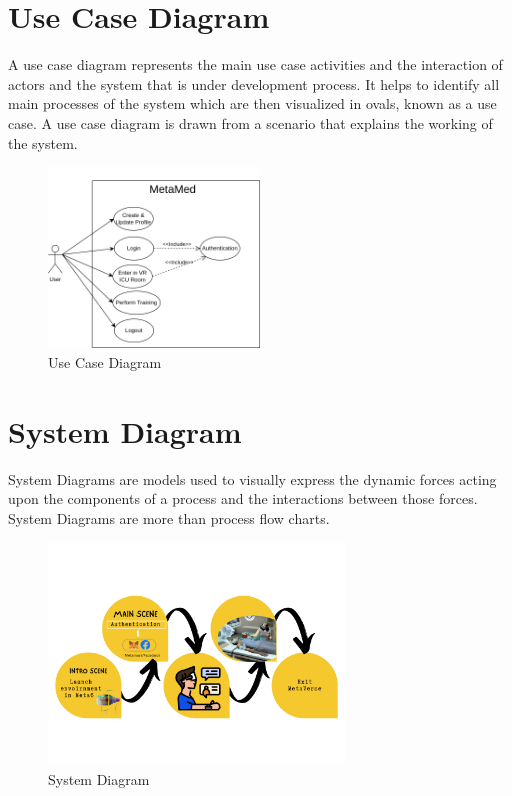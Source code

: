 \section{Use Case Diagram}
A use case diagram represents the main use case activities and the interaction of actors and the system that is under development process. It helps to identify all main processes of the system which are then visualized in ovals, known as a use case. A use case diagram is drawn from a scenario that explains the working of the system.
\begin{figure}[h]
    \centering
    \includegraphics[width=0.5\textwidth, height=0.3\textheight]{Images/Use Case.drawio.png}
    \caption{Use Case Diagram}
    \label{fig:system-diagram}
\end{figure}


\section{System Diagram}
System Diagrams are models used to visually express the dynamic forces acting upon the components of a process and the interactions between those forces. System Diagrams are more than process flow charts.
\begin{figure}[h]
    \centering
    \includegraphics[width=0.7\textwidth, height=0.3\textheight]{Images/system.png}
    \caption{System Diagram}
    \label{fig:system-diagram}
\end{figure}





